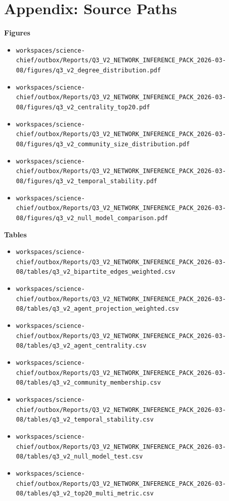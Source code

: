 \documentclass[11pt,a4paper]{article}
\begin{document}
\section*{Appendix: Source Paths}
\textbf{Figures}\\
\begin{itemize}
\item \texttt{workspaces/science-chief/outbox/Reports/Q3\_V2\_NETWORK\_INFERENCE\_PACK\_2026-03-08/figures/q3\_v2\_degree\_distribution.pdf}
\item \texttt{workspaces/science-chief/outbox/Reports/Q3\_V2\_NETWORK\_INFERENCE\_PACK\_2026-03-08/figures/q3\_v2\_centrality\_top20.pdf}
\item \texttt{workspaces/science-chief/outbox/Reports/Q3\_V2\_NETWORK\_INFERENCE\_PACK\_2026-03-08/figures/q3\_v2\_community\_size\_distribution.pdf}
\item \texttt{workspaces/science-chief/outbox/Reports/Q3\_V2\_NETWORK\_INFERENCE\_PACK\_2026-03-08/figures/q3\_v2\_temporal\_stability.pdf}
\item \texttt{workspaces/science-chief/outbox/Reports/Q3\_V2\_NETWORK\_INFERENCE\_PACK\_2026-03-08/figures/q3\_v2\_null\_model\_comparison.pdf}
\end{itemize}

\textbf{Tables}\\
\begin{itemize}
\item \texttt{workspaces/science-chief/outbox/Reports/Q3\_V2\_NETWORK\_INFERENCE\_PACK\_2026-03-08/tables/q3\_v2\_bipartite\_edges\_weighted.csv}
\item \texttt{workspaces/science-chief/outbox/Reports/Q3\_V2\_NETWORK\_INFERENCE\_PACK\_2026-03-08/tables/q3\_v2\_agent\_projection\_weighted.csv}
\item \texttt{workspaces/science-chief/outbox/Reports/Q3\_V2\_NETWORK\_INFERENCE\_PACK\_2026-03-08/tables/q3\_v2\_agent\_centrality.csv}
\item \texttt{workspaces/science-chief/outbox/Reports/Q3\_V2\_NETWORK\_INFERENCE\_PACK\_2026-03-08/tables/q3\_v2\_community\_membership.csv}
\item \texttt{workspaces/science-chief/outbox/Reports/Q3\_V2\_NETWORK\_INFERENCE\_PACK\_2026-03-08/tables/q3\_v2\_temporal\_stability.csv}
\item \texttt{workspaces/science-chief/outbox/Reports/Q3\_V2\_NETWORK\_INFERENCE\_PACK\_2026-03-08/tables/q3\_v2\_null\_model\_test.csv}
\item \texttt{workspaces/science-chief/outbox/Reports/Q3\_V2\_NETWORK\_INFERENCE\_PACK\_2026-03-08/tables/q3\_v2\_top20\_multi\_metric.csv}
\end{itemize}
\end{document}

